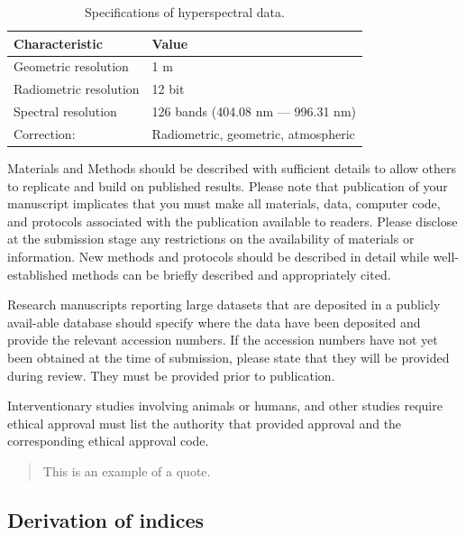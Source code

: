 \documentclass[remotesensing,article,submit,moreauthors,pdftex]{Definitions/mdpi}
\begin{document}

\begin{table}[t]
	\centering
	\caption[t]{Specifications of hyperspectral data.}
	\begingroup
	\begin{tabular}{ll}
		\\
		Characteristic         & Value                               \\
		\toprule
		Geometric resolution   & 1 m                                 \\
		Radiometric resolution & 12 bit                              \\
		Spectral resolution    & 126 bands (404.08 nm --- 996.31 nm) \\
		Correction:            & Radiometric, geometric, atmospheric
	\end{tabular}
	\endgroup\label{tab:hyperparameter_metadata}
\end{table}

Materials and Methods should be described with sufficient details to allow others to replicate and build on published results. Please note that publication of your manuscript implicates that you must make all materials, data, computer code, and protocols associated with the publication available to readers. Please disclose at the submission stage any restrictions on the availability of materials or information. New methods and protocols should be described in detail while well-established methods can be briefly described and appropriately cited.

Research manuscripts reporting large datasets that are deposited in a publicly avail-able database should specify where the data have been deposited and provide the relevant accession numbers. If the accession numbers have not yet been obtained at the time of submission, please state that they will be provided during review. They must be provided prior to publication.

Interventionary studies involving animals or humans, and other studies require ethical approval must list the authority that provided approval and the corresponding ethical approval code.
\begin{quote}
	This is an example of a quote.
\end{quote}

\subsection{Derivation of indices}
\end{document}
